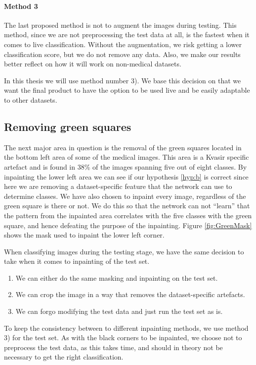 \paragraph{Method 3}
The last proposed method is not to augment the images during testing. This method, since we are not preprocessing the test data at all, is the fastest when it comes to live classification. Without the augmentation, we risk getting a lower classification score, but we do not remove any data. Also, we make our results better reflect on how it will work on non-medical datasets.


In this thesis we will use method number 3). 
We base this decision on that we want the final product to have the option to be used live and be easily adaptable to other datasets.



\subsection{Removing green squares}
The next major area in question is the removal of the green squares located in the bottom left area of some of the medical images.  This area is a Kvasir specific artefact and is found in 38\% of the images spanning five out of eight classes. 
By inpainting the lower left area we can see if our hypothesis \ref{hyp:b} is correct since here we are removing a dataset-specific feature that the network can use to determine classes. 
We have also chosen to inpaint every image, regardless of the green square is there or not. We do this so that the network can not ``learn'' that the pattern from the inpainted area correlates with the five classes with the green square, and hence defeating the purpose of the inpainting. Figure \ref{fig:GreenMask} shows the mask used to inpaint the lower left corner.

When classifying images during the testing stage, we have the same decision to take when it comes to inpainting of the test set.
\begin{enumerate}
\item We can either do the same masking and inpainting on the test set. 
\item We can crop the image in a way that removes the dataset-specific artefacts.
\item We can forgo modifying the test data and just run the test set as is. 
\end{enumerate}

To keep the consistency between to different inpainting methods, we use method 3) for the test set.
As with the black corners to be inpainted, we choose not to preprocess the test data, as this takes time, and should in theory not be necessary to get the right classification.
 

